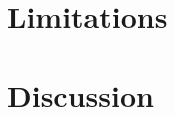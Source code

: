 
\hypertarget{limitations}{%
\section{Limitations}\label{simwrapper-limitations}}


\hypertarget{discussion}{%
\section{Discussion}\label{simwrapper-discussion}}
